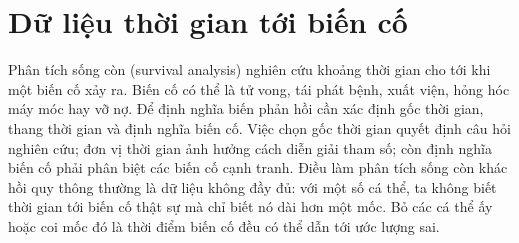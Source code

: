 \documentclass[11pt,a4paper,notitlepage]{report}
\begin{document}
\section{Dữ liệu thời gian tới biến cố}

Phân tích sống còn (survival analysis) nghiên cứu khoảng thời gian cho tới khi một biến cố xảy ra.
Biến cố có thể là tử vong, tái phát bệnh, xuất viện, hỏng hóc máy móc hay vỡ nợ. Để định nghĩa
biến phản hồi cần xác định gốc thời gian, thang thời gian và định nghĩa biến cố. Việc chọn gốc
thời gian quyết định câu hỏi nghiên cứu; đơn vị thời gian ảnh hưởng cách diễn giải tham số; còn
định nghĩa biến cố phải phân biệt các biến cố cạnh tranh.
Điều làm phân tích sống còn khác hồi quy thông thường là dữ liệu không đầy đủ: với một số cá
thể, ta không biết thời gian tới biến cố thật sự mà chỉ biết nó dài hơn một mốc. Bỏ các cá thể ấy
hoặc coi mốc đó là thời điểm biến cố đều có thể dẫn tới ước lượng sai.
\end{document}
